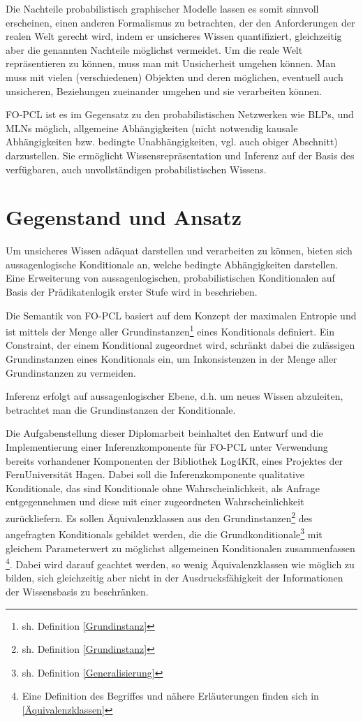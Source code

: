 \documentclass[a4paper, 11pt]{book}
\begin{document}
Die Nachteile probabilistisch graphischer Modelle lassen es somit sinnvoll erscheinen, einen anderen Formalismus zu betrachten, der den Anforderungen der realen Welt  gerecht wird, indem er unsicheres Wissen quantifiziert, gleichzeitig aber die genannten Nachteile möglichst vermeidet. Um die reale Welt repräsentieren zu können, muss man mit Unsicherheit umgehen können. Man muss mit vielen (verschiedenen) Objekten und deren möglichen, eventuell auch unsicheren,  Beziehungen zueinander umgehen und sie verarbeiten können.

FO-PCL ist es im Gegensatz zu den probabilistischen Netzwerken wie BLPs, und MLNs möglich, allgemeine Abhängigkeiten (nicht notwendig kausale Abhängigkeiten bzw. bedingte Unabhängigkeiten, vgl. auch obiger Abschnitt) darzustellen. Sie ermöglicht Wissensrepräsentation und Inferenz auf der Basis des verfügbaren, auch unvollständigen probabilistischen Wissens. 


\section{Gegenstand und Ansatz}
Um unsicheres Wissen adäquat darstellen und verarbeiten zu können, bieten sich aussagenlogische Konditionale  an, welche bedingte Abhängigkeiten darstellen. Eine Erweiterung von aussagenlogischen, probabilistischen Konditionalen auf Basis der Prädikatenlogik erster Stufe wird in \cite[Kap. 6]{Fis10} beschrieben.

 Die Semantik von FO-PCL basiert auf dem Konzept der maximalen Entropie und ist mittels der Menge aller Grundinstanzen\footnote{sh. Definition \ref{Grundinstanz}} eines Konditionals definiert. Ein Constraint, der einem Konditional zugeordnet wird, schränkt dabei die zulässigen Grundinstanzen eines Konditionals ein, um Inkonsistenzen in der Menge aller Grundinstanzen zu vermeiden.
 
Inferenz erfolgt auf aussagenlogischer Ebene, d.h. um neues Wissen abzuleiten, betrachtet man die Grundinstanzen der Konditionale.


Die Aufgabenstellung dieser Diplomarbeit beinhaltet den Entwurf und die Implementierung einer Inferenzkomponente für FO-PCL unter Verwendung bereits vorhandener Komponenten der Bibliothek Log4KR, eines Projektes der FernUniversität Hagen. Dabei soll die Inferenzkomponente qualitative Konditionale, das sind Konditionale ohne Wahrscheinlichkeit, als Anfrage entgegennehmen und diese mit einer zugeordneten Wahrscheinlichkeit zurückliefern. Es sollen Äquivalenzklassen   aus den Grundinstanzen\footnote{sh. Definition \ref{Grundinstanz}}  des angefragten Konditionals gebildet werden, die die Grundkonditionale\footnote{sh. Definition \ref{Generalisierung}} mit gleichem Parameterwert zu möglichst allgemeinen Konditionalen zusammenfassen \footnote{Eine Definition des Begriffes und nähere Erläuterungen finden sich in \ref{Äquivalenzklassen}}. Dabei wird darauf geachtet werden, so wenig Äquivalenzklassen wie möglich zu bilden, sich gleichzeitig aber nicht in der Ausdrucksfähigkeit der Informationen der Wissensbasis zu beschränken.
\end{document}
